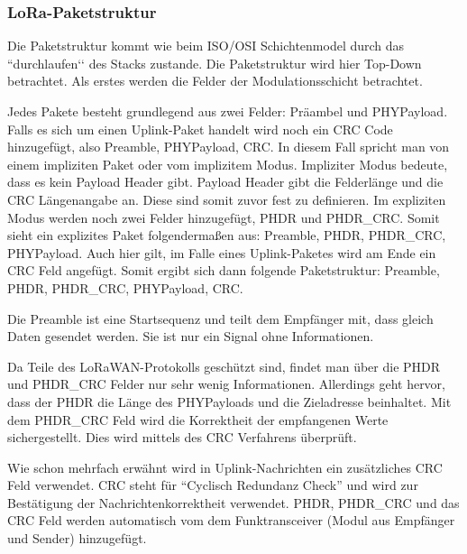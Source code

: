 \documentclass[a4paper, 12pt]{article}
\begin{document}
            \subsubsection{LoRa-Paketstruktur}
                Die Paketstruktur kommt wie beim ISO/OSI Schichtenmodel durch das ``durchlaufen‘‘ des Stacks zustande. 
                Die Paketstruktur wird hier Top-Down betrachtet. Als erstes werden die Felder
                der Modulationsschicht betrachtet.

                Jedes Pakete besteht grundlegend aus zwei Felder: Präambel und PHYPayload. Falls es sich um einen 
                Uplink-Paket handelt wird noch ein CRC Code hinzugefügt, also Preamble, PHYPayload, CRC. 
                In diesem Fall spricht man von einem impliziten Paket oder vom implizitem Modus. Impliziter Modus bedeute, 
                dass es kein Payload Header gibt. Payload Header gibt die Felderlänge und die CRC Längenangabe an. 
                Diese sind somit zuvor fest zu definieren. Im expliziten Modus werden noch zwei Felder hinzugefügt, 
                PHDR und PHDR\_CRC. Somit sieht ein explizites Paket folgendermaßen aus: Preamble, PHDR, PHDR\_CRC, 
                PHYPayload. Auch hier gilt, im Falle
                eines Uplink-Paketes wird am Ende ein CRC Feld angefügt. Somit ergibt sich dann folgende Paketstruktur: 
                Preamble, PHDR, PHDR\_CRC, PHYPayload, CRC.

                Die Preamble ist eine Startsequenz und teilt dem Empfänger mit, dass gleich Daten gesendet werden. 
                Sie ist nur ein Signal ohne Informationen.

                Da Teile des LoRaWAN-Protokolls geschützt sind, findet man über die PHDR und PHDR\_CRC Felder nur sehr wenig 
                Informationen. Allerdings geht hervor, dass der PHDR die Länge des PHYPayloads und die Zieladresse 
                beinhaltet.
                Mit dem PHDR\_CRC Feld wird die Korrektheit der empfangenen Werte sichergestellt. Dies wird  
                mittels des CRC Verfahrens überprüft.
                
                Wie schon mehrfach erwähnt wird in Uplink-Nachrichten ein zusätzliches CRC Feld verwendet. CRC steht für 
                ``Cyclisch Redundanz Check'' und wird zur Bestätigung der Nachrichtenkorrektheit verwendet. 
                PHDR, PHDR\_CRC 
                und das CRC Feld werden automatisch vom dem Funktransceiver (Modul aus Empfänger und Sender) hinzugefügt.
\end{document}
